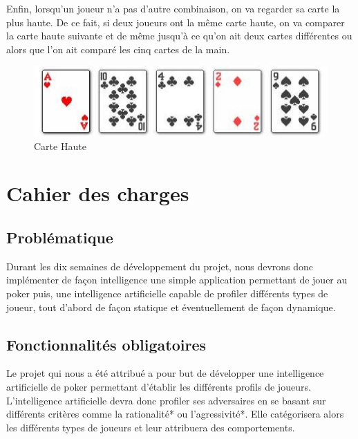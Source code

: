 \documentclass{report}
\begin{document}
Enfin, lorsqu'un joueur n'a pas d'autre combinaison, on va regarder sa carte la plus haute. De ce fait, si deux joueurs ont la même carte haute, on va comparer la carte haute suivante et de même jusqu'à ce qu'on ait deux cartes différentes ou alors que l'on ait comparé les cinq cartes de la main. \par
		\begin{figure}[h]
			\begin{center}
				\includegraphics[scale=0.4]{./imagesRapport/carteHaute.jpg}
			\end{center}
			\caption[Carte Haute]{Carte Haute}
		\end{figure}
		\medskip

\section{Cahier des charges}
\subsection{Problématique}
\hspace{0.5cm}Durant les dix semaines de développement du projet, nous devrons donc implémenter de façon intelligence une simple application permettant de jouer au poker puis, une intelligence artificielle capable de profiler différents types de joueur, tout d'abord de façon statique et éventuellement de façon dynamique.
\subsection{Fonctionnalités obligatoires}

\hspace{0.5cm}Le projet qui nous a été attribué a pour but de développer une intelligence artificielle de poker permettant d'établir les différents profils de joueurs.\\

L'intelligence artificielle devra donc profiler ses adversaires en se basant sur différents critères comme la rationalité* ou l'agressivité*. Elle catégorisera alors les différents types de joueurs et leur attribuera des comportements.\\
\end{document}
